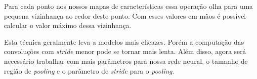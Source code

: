Para cada ponto nos nossos mapas de características essa operação
olha para uma pequena vizinhança ao redor deste ponto. Com esses
valores em mãos é possível calcular o valor máximo dessa vizinhança.

Esta técnica geralmente leva a modelos mais eficazes. Porém a
computação das convoluções com \textit{stride} menor pode se tornar mais
lenta. Além disso, agora será necessário trabalhar com mais parâmetros
para nossa rede neural, o tamanho de região de \textit{pooling} e o parâmetro
de \textit{stride} para o \textit{pooling}.

